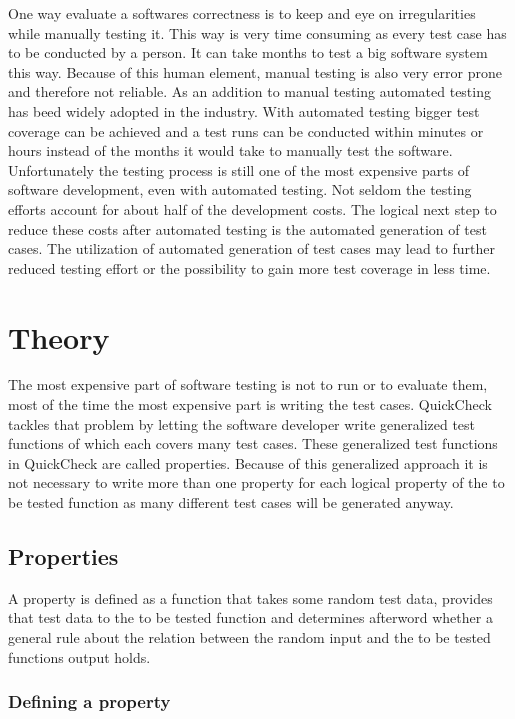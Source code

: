 \documentclass[a4paper, 12pt]{article} %
\begin{document}
One way evaluate a softwares correctness is to keep and eye on irregularities while manually testing it. This way is very time consuming as every test case has to be conducted by a person. It can take months to test a big software system this way. Because of this human element, manual testing is also very error prone and therefore not reliable. As an addition to manual testing automated testing has beed widely adopted in the industry. With automated testing bigger test coverage can be achieved and a test runs can be conducted within minutes or hours instead of the months it would take to manually test the software. Unfortunately the testing process is still one of the most expensive parts of software development, even with automated testing. Not seldom the testing efforts account for about half of the development costs. \cite{Claessen2000} The logical next step to reduce these costs after automated testing is the automated generation of test cases. The utilization of automated generation of test cases may lead to further reduced testing effort or the possibility to gain more test coverage in less time.

\section{Theory}

The most expensive part of software testing is not to run or to evaluate them, most of the time the most expensive part is writing the test cases. QuickCheck tackles that problem by letting the software developer write generalized test functions of which each covers many test cases. These generalized test functions in QuickCheck are called properties. \cite{Hughes2010} Because of this generalized approach it is not necessary to write more than one property for each logical property of the to be tested function as many different test cases will be generated anyway. \cite{Hughes2006}

\subsection{Properties}

A property is defined as a function that takes some random test data, provides that test data to the to be tested function and determines afterword whether a general rule about the relation between the random input and the to be tested functions output holds.

\subsubsection{Defining a property}
\end{document}
